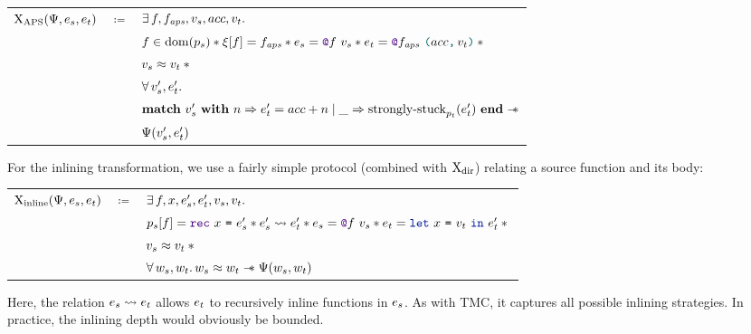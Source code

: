 \medskip
\begin{tabular}{rcl}
        $\iProt_\mathrm{APS} (\iPredTwo, \datalangExpr_s, \datalangExpr_t)$
        & $\coloneqq$ &
        $\exists \datalangFn, \datalangFn_\mathit{aps}, \datalangVal_s, acc, \datalangVal_t \ldotp$
    \\
        &&
        $\datalangFn \in \dom{\datalangProg_s} \iSep
        \datalangRenaming [\datalangFn] = \datalangFn_\mathit{aps} \iSep
        \datalangExpr_s = \datalangCall{\datalangFnptr{\datalangFn}}{\datalangVal_s} \iSep
        \datalangExpr_t = \datalangCall{\datalangFnptr{\datalangFn_\mathit{aps}}}{\datalangPair{acc}{\datalangVal_t}} \iSep {}$
    \\
        &&
        $\datalangVal_s \iSimilar \datalangVal_t \iSep {}$
    \\
        &&
        $\forall \datalangVal_s', \datalangExpr_t' \ldotp$
    \\
        &&
        $\bm{\mathrm{match}}\ \datalangVal_s'\ \bm{\mathrm{with}}\ \datalangNat \Rightarrow \datalangExpr_t' = acc + \datalangNat \mid \_ \Rightarrow \mathrm{strongly \mathhyphen stuck}_{\datalangProg_t} (\datalangExpr_t')\ \bm{\mathrm{end}} \iWand$
    \\
        &&
        $\iPredTwo (\datalangVal_s', \datalangExpr_t')$
\end{tabular}
\medskip

For the inlining transformation, we use a fairly simple protocol (combined with $\mathrm{X}_\mathrm{dir}$) relating a source function and its body:

\medskip
\begin{tabular}{rcl}
        $\iProt_\mathrm{inline} (\iPredTwo, \datalangExpr_s, \datalangExpr_t)$
        & $\coloneqq$ &
        $\exists \datalangFn, \datalangVar, \datalangExpr_s', \datalangExpr_t', \datalangVal_s, \datalangVal_t \ldotp$
    \\
        &&
        $\datalangProg_s [\datalangFn] = \datalangRec{\datalangVar}{\datalangExpr_s'} \iSep
        \datalangExpr_s' \rightsquigarrow \datalangExpr_t' \iSep
        \datalangExpr_s = \datalangCall{\datalangFnptr{\datalangFn}}{\datalangVal_s} \iSep
        \datalangExpr_t = \datalangLet{\datalangVar}{\datalangVal_t}{\datalangExpr_t'} \iSep {}$
    \\
        &&
        $\datalangVal_s \iSimilar \datalangVal_t \iSep {}$
    \\
        &&
        $\forall \datalangValTwo_s, \datalangValTwo_t \ldotp
        \datalangValTwo_s \iSimilar \datalangValTwo_t \iWand
        \iPredTwo (\datalangValTwo_s, \datalangValTwo_t)$
\end{tabular}
\medskip

Here, the relation $\datalangExpr_s \rightsquigarrow \datalangExpr_t$ allows $\datalangExpr_t$ to recursively inline functions in $\datalangExpr_s$.
As with TMC, it captures all possible inlining strategies.
In practice, the inlining depth would obviously be bounded.

